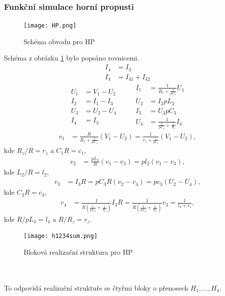 \subsubsection{Funkční simulace horní propusti}
\begin{figure}[h]
\centering
\texttt{[image: HP.png]}
\caption{Schéma obvodu pro HP \label{s:HP12}}
\end{figure}
Schéma z obrázku \ref{s:HP12} bylo popsáno rovnicemi.
\begin{align}
I_4 &= I_3 \\
I_4 &= I_{41} + I_{42}
\end{align}
\begin{equation}
\begin{split}
U_1 &= V_1 - U_2 \\
I_2 &= I_1 - I_3 \\
U_3 &= U_2 - U_4 \\
I_4 &= I_3
\end{split}
\quad \quad
\begin{split}
I_1 &= \frac{1}{R_1 + \frac{1}{pC_1}}U_1\\
U_2 &= I_2pL_2 \\
I_3 &= U_3pC_3\\
U_4 &= \frac{1}{\frac{1}{pC_4} + \frac{1}{R_z}}I_4
\end{split}
\end{equation}
\begin{align}
v_1 &= \frac{R}{R_z + \frac{1}{pC_1}}(V_1 - U_2) = \frac{1}{r_z + \frac{1}{pc_1}}(V_1 - U_2),
\end{align}
kde $R_z/R = r_z$ a $C_1R = c_1$,
\begin{align}
v_2 &= \frac{pL_2}{R}(v_1 - v_3) = pl_2(v_1 - v_3),
\end{align}
kde $L_2/R = l_2$,
\begin{align}
v_3 &= I_3R = pC_3R(v_2 - v_4) = pc_3(U_2 - U_4),
\end{align}
kde $C_3R = c_3$,
\begin{align}
v_4 &= \frac{1}{R(\frac{1}{pL_4} + \frac{1}{R_z})}I_3R = \frac{1}{R(\frac{1}{pL_4} + \frac{1}{R_z})}v_3 = \frac{1}{l_4 + r_z},
\end{align}
kde $R/pL_4 = l_4$ a $R/R_z = r_z$.
\begin{figure}[h]
\centering
\texttt{[image: h1234sum.png]}
\caption{Bloková realizační struktura pro HP}
\end{figure}
\\
\\
\noindent To odpovídá realizační struktuře se čtyřmi bloky o přenosech $H_1, \ldots,H_4$.
